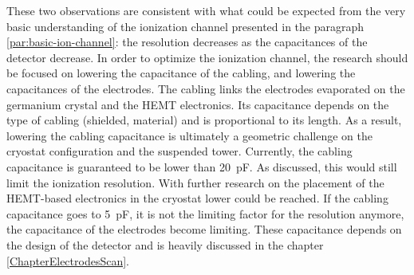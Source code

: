 These two observations are consistent with what could be expected from the very basic understanding of the ionization channel presented in the paragraph \ref{par:basic-ion-channel}: the resolution decreases as the capacitances of the detector decrease. 
In order to optimize the ionization channel, the research should be focused on lowering the capacitance of the cabling, and lowering the capacitances of the electrodes.
The cabling links the electrodes evaporated on the germanium crystal and the HEMT electronics. Its capacitance depends on the type of cabling (shielded, material) and is proportional to its length. As a result, lowering the cabling capacitance is ultimately a geometric challenge on the cryostat configuration and the suspended tower. Currently, the cabling capacitance is guaranteed to be lower than \SI{20}{\pico\farad}. As discussed, this would still limit the ionization resolution. With further research on the placement of the HEMT-based electronics in the cryostat lower could be reached. If the cabling capacitance goes to \SI{5}{\pico\farad}, it is not the limiting factor for the resolution anymore, the capacitance of the electrodes become limiting. These capacitance depends on the design of the detector and is heavily discussed in the chapter \ref{ChapterElectrodesScan}.
